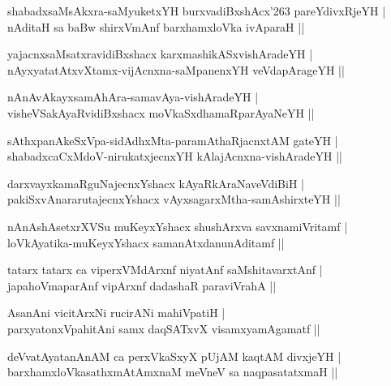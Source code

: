 \begin{shloka}
shabadxsaMsAkxra-saMyuketxYH burxvadiBxshAcx\char'263 pareYdivxRjeYH |\\
nAditaH sa baBw shirxVmAnf barxhamxloVka ivAparaH ||
\end{shloka}

\begin{shloka}
yajacnxsaMsatxravidiBxshacx karxmashikASxvishAradeYH |\\
nAyxyatatAtxvXtamx-vijAcnxna-saMpanenxYH veVdapArageYH ||
\end{shloka}

\begin{shloka}
nAnAvAkayxsamAhAra-samavAya-vishAradeYH |\\
visheVSakAyaRvidiBxshacx moVkaSxdhamaRparAyaNeYH ||
\end{shloka}

\begin{shloka}
sAthxpanAkeSxVpa-sidAdhxMta-paramAthaRjacnxtAM gateYH |\\
shabadxcaCxMdoV-nirukatxjecnxYH kAlajAcnxna-vishAradeYH ||
\end{shloka}

\begin{shloka}
darxvayxkamaRguNajecnxYshacx kAyaRkAraNaveVdiBiH |\\
pakiSxvAnararutajecnxYshacx vAyxsagarxMtha-samAshirxteYH ||\\
\end{shloka}

\begin{shloka}
nAnAshAsetxrXVSu muKeyxYshacx shushArxva savxnamiVritamf |\\
loVkAyatika-muKeyxYshacx samanAtxdanunAditamf ||
\end{shloka}

\begin{shloka}
tatarx tatarx ca viperxVMdArxnf niyatAnf saMshitavarxtAnf |\\
japahoVmaparAnf vipArxnf dadashaR paraviVrahA ||
\end{shloka}

\begin{shloka}
AsanAni vicitArxNi rucirANi mahiVpatiH |\\
parxyatonxVpahitAni samx daqSATxvX visamxyamAgamatf ||
\end{shloka}

\begin{shloka}
deVvatAyatanAnAM ca perxVkaSxyX pUjAM kaqtAM divxjeYH |\\
barxhamxloVkasathxmAtAmxnaM meVneV sa naqpasatatxmaH ||
\end{shloka}

